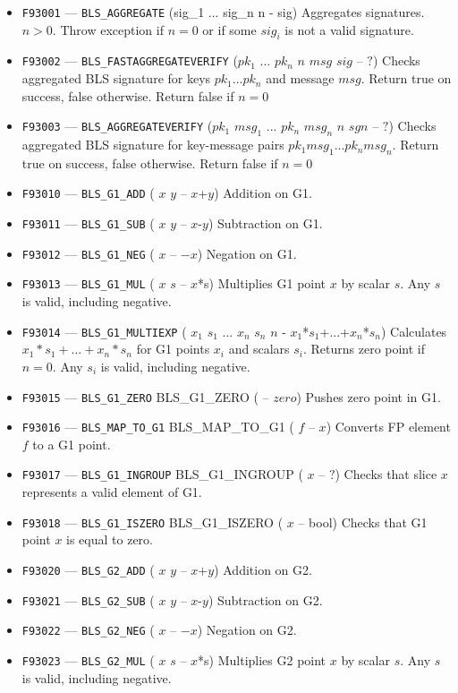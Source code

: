 \documentclass[12pt,oneside]{article}
\begin{document}
\begin{itemize}
\item {\tt F93001} --- {\tt BLS_AGGREGATE} (sig_1 ... sig_n n - sig) Aggregates signatures. $n>0$. Throw exception if $n=0$ or if some $sig_i$ is not a valid signature.
\item {\tt F93002} --- {\tt BLS_FASTAGGREGATEVERIFY} ($pk_1$ ... $pk_n$ $n$ $msg$ $sig$ -- $?$) Checks aggregated BLS signature for keys $pk_1...pk_n$ and message $msg$. Return true on success, false otherwise. Return false if $n=0$
\item {\tt F93003} --- {\tt BLS_AGGREGATEVERIFY} ($pk_1$ $msg_1$ ... $pk_n$ $msg_n$ $n$ $sgn$ -- $?$) Checks aggregated BLS signature for key-message pairs $pk_1 msg_1...pk_n msg_n$. Return true on success, false otherwise. Return false if $n=0$
\item {\tt F93010} --- {\tt BLS_G1_ADD} ( $x$ $y$ -- $x$+$y$) Addition on G1.
\item {\tt F93011} --- {\tt BLS_G1_SUB} ( $x$ $y$ -- $x$-$y$) Subtraction on G1.
\item {\tt F93012} --- {\tt BLS_G1_NEG} ( $x$ -- $-x$) Negation on G1.
\item {\tt F93013} --- {\tt BLS_G1_MUL} ( $x$ $s$ -- $x$*s) Multiplies G1 point $x$ by scalar $s$. Any $s$ is valid, including negative.
\item {\tt F93014} --- {\tt BLS_G1_MULTIEXP} ( $x_1$ $s_1$ ... $x_n$ $s_n$ $n$ - $x_1$*$s_1$+...+$x_n$*$s_n$) Calculates $x_1*s_1+...+x_n*s_n$ for G1 points $x_i$ and scalars $s_i$. Returns zero point if $n=0$. Any $s_i$ is valid, including negative.
\item {\tt F93015} --- {\tt BLS_G1_ZERO} BLS_G1_ZERO ( -- $zero$) Pushes zero point in G1.
\item {\tt F93016} --- {\tt BLS_MAP_TO_G1} BLS_MAP_TO_G1 ( $f$ -- $x$) Converts FP element $f$ to a G1 point.
\item {\tt F93017} --- {\tt BLS_G1_INGROUP} BLS_G1_INGROUP ( $x$ -- $?$) Checks that slice $x$ represents a valid element of G1.
\item {\tt F93018} --- {\tt BLS_G1_ISZERO} BLS_G1_ISZERO ( $x$ -- bool) Checks that G1 point $x$ is equal to zero.
\item {\tt F93020} --- {\tt BLS_G2_ADD} ( $x$ $y$ -- $x$+$y$) Addition on G2.
\item {\tt F93021} --- {\tt BLS_G2_SUB} ( $x$ $y$ -- $x$-$y$) Subtraction on G2.
\item {\tt F93022} --- {\tt BLS_G2_NEG} ( $x$ -- $-x$) Negation on G2.
\item {\tt F93023} --- {\tt BLS_G2_MUL} ( $x$ $s$ -- $x$*s) Multiplies G2 point $x$ by scalar $s$. Any $s$ is valid, including negative.

\end{itemize}
\end{document}
